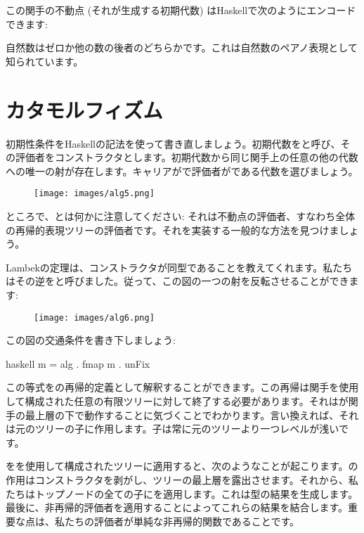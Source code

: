 この関手の不動点 (それが生成する初期代数) はHaskellで次のようにエンコードできます: 

自然数はゼロか他の数の後者のどちらかです。これは自然数のペアノ表現として知られています。

\section{カタモルフィズム}

初期性条件をHaskellの記法を使って書き直しましょう。初期代数をと呼び、その評価者をコンストラクタとします。初期代数から同じ関手上の任意の他の代数への唯一の射が存在します。キャリアがで評価者がである代数を選びましょう。

\begin{figure}[H]
  \centering
  \texttt{[image: images/alg5.png]}
\end{figure}

\noindent
ところで、とは何かに注意してください: それは不動点の評価者、すなわち全体の再帰的表現ツリーの評価者です。それを実装する一般的な方法を見つけましょう。

Lambekの定理は、コンストラクタが同型であることを教えてくれます。私たちはその逆をと呼びました。従って、この図の一つの射を反転させることができます: 

\begin{figure}[H]
  \centering
  \texttt{[image: images/alg6.png]}
\end{figure}

\noindent
この図の交通条件を書き下しましょう: 

\begin{snip}{haskell}
m = alg . fmap m . unFix
\end{snip}
この等式をの再帰的定義として解釈することができます。この再帰は関手を使用して構成された任意の有限ツリーに対して終了する必要があります。それはが関手の最上層の下で動作することに気づくことでわかります。言い換えれば、それは元のツリーの子に作用します。子は常に元のツリーより一つレベルが浅いです。

をを使用して構成されたツリーに適用すると、次のようなことが起こります。の作用はコンストラクタを剥がし、ツリーの最上層を露出させます。それから、私たちはトップノードの全ての子にを適用します。これは型の結果を生成します。最後に、非再帰的評価者を適用することによってこれらの結果を結合します。重要な点は、私たちの評価者が単純な非再帰的関数であることです。

